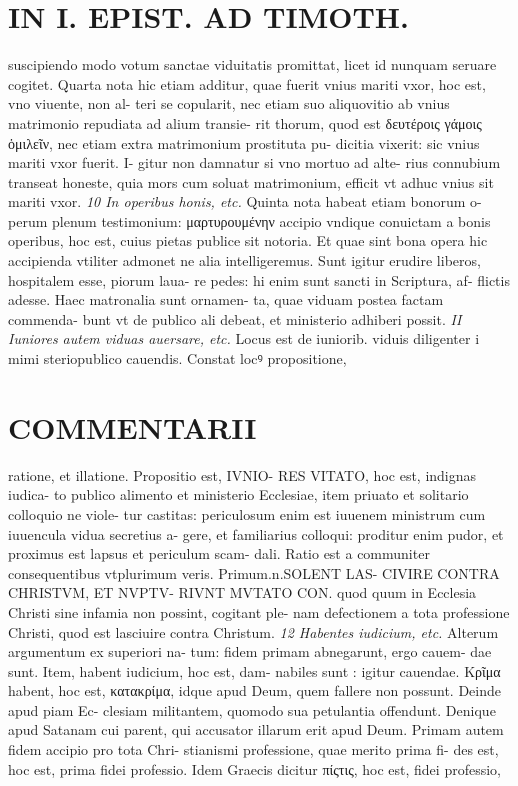 \documentclass{article}
\begin{document}
\begin{pages}
\section*{IN I. EPIST. AD TIMOTH. }\pstart suscipiendo modo votum sanctae viduitatis promittat, licet id nunquam seruare cogitet.  \pend\pstart Quarta nota hic etiam additur, quae fuerit vnius mariti vxor, hoc est, vno viuente, non al- teri se copularit, nec etiam suo aliquovitio ab vnius matrimonio repudiata ad alium transie- rit thorum, quod est δευτέροις γάμοις ὁμιλεῖν, nec etiam extra matrimonium prostituta pu- dicitia vixerit: sic vnius mariti vxor fuerit. I- gitur non damnatur si vno mortuo ad alte- rius connubium transeat honeste, quia mors cum soluat matrimonium, efficit vt adhuc vnius sit mariti vxor.  \pend
\textit{10 In operibus honis, etc. }\pstart Quinta nota habeat etiam bonorum o- perum plenum testimonium: μαρτυρουμένην accipio vndique conuictam a bonis operibus, hoc est, cuius pietas publice sit notoria. Et quae sint bona opera hic accipienda vtiliter admonet ne alia intelligeremus. Sunt igitur erudire liberos, hospitalem esse, piorum laua- re pedes: hi enim sunt sancti in Scriptura, af- flictis adesse. Haec matronalia sunt ornamen- ta, quae viduam postea factam commenda- bunt vt de publico ali debeat, et ministerio adhiberi possit.  \pend
\textit{II Iuniores autem viduas auersare, etc. }\pstart Locus est de iuniorib. viduis diligenter i mimi steriopublico cauendis. Constat locꝰ propositione,  \pend
\marginpar{[ p.127 ]}
\marginpar{[ p.128 ]}
\section*{COMMENTARII }\pstart ratione, et illatione. Propositio est, IVNIO- RES VITATO, hoc est, indignas iudica- to publico alimento et ministerio Ecclesiae, item priuato et solitario colloquio ne viole- tur castitas: periculosum enim est iuuenem ministrum cum iuuencula vidua secretius a- gere, et familiarius colloqui: proditur enim pudor, et proximus est lapsus et periculum scam- dali. Ratio est a communiter consequentibus vtplurimum veris. Primum.n.SOLENT LAS- CIVIRE CONTRA CHRISTVM, ET NVPTV- RIVNT MVTATO CON. quod quum in Ecclesia Christi sine infamia non possint, cogitant ple- nam defectionem a tota professione Christi, quod est lasciuire contra Christum.  \pend
\textit{12 Habentes iudicium, etc. }\pstart Alterum argumentum ex superiori na- tum: fidem primam abnegarunt, ergo cauem- dae sunt. Item, habent iudicium, hoc est, dam- nabiles sunt : igitur cauendae. Κρῖμα habent, hoc est, κατακρίμα, idque apud Deum, quem fallere non possunt. Deinde apud piam Ec- clesiam militantem, quomodo sua petulantia offendunt. Denique apud Satanam cui parent, qui accusator illarum erit apud Deum.  \pend\pstart Primam autem fidem accipio pro tota Chri- stianismi professione, quae merito prima fi- des est, hoc est, prima fidei professio. Idem Graecis dicitur πίςτις, hoc est, fidei professio,  \pend

\end{pages}
\end{document}
